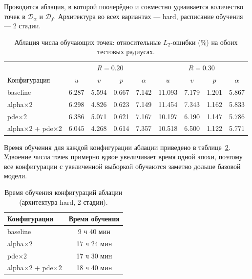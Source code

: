 \documentclass[12pt,a4paper]{article}
\begin{document}
Проводится аблация, в которой поочерёдно и совместно удваивается количество
точек в \(\mathcal{D}_\alpha\) и \(\mathcal{D}_f\). Архитектура во всех
вариантах --- hard, расписание обучения --- 2 стадии.

\begin{table}[H]
    \centering
    \begin{tabular}{l|cccc|cccc}
        \hline
        & \multicolumn{4}{c|}{\(R=0.20\)} & \multicolumn{4}{c}{\(R=0.30\)} \\
        Конфигурация & \(u\) & \(v\) & \(p\) & \(\alpha\) & \(u\) & \(v\) & \(p\) & \(\alpha\) \\
        \hline
        baseline                          & 6.287 & 5.594 & 0.667 & 7.142 & 11.093 & 7.179 & 1.201 & 5.867 \\
        alpha$\times$2                    & 6.298 & 4.826 & 0.623 & 7.149 & 11.454 & 7.343 & 1.162 & 5.833 \\
        pde$\times$2                      & 6.386 & 5.071 & 0.621 & 7.167 & 10.197 & 6.190 & 1.147 & 5.786 \\
        alpha$\times$2 + pde$\times$2     & 6.045 & 4.268 & 0.614 & 7.357 & 10.518 & 6.500 & 1.122 & 5.771 \\
        \hline
    \end{tabular}
    \caption{Аблация числа обучающих точек: относительные \(L_2\)-ошибки (\%) на обоих тестовых радиусах.}
    \label{tab:ablation}
\end{table}

Время обучения для каждой конфигурации аблации приведено в
таблице~\ref{tab:ablation_time}. Удвоение числа точек примерно вдвое увеличивает
время одной эпохи, поэтому все конфигурации с увеличенной выборкой обучаются
заметно дольше базовой модели.

\begin{table}[H]
    \centering
    \begin{tabular}{l|c}
        \hline
        Конфигурация & Время обучения \\
        \hline
        baseline              & 9 ч 40 мин \\
        alpha$\times$2        & 17 ч 24 мин \\
        pde$\times$2          & 17 ч 30 мин \\
        alpha$\times$2 + pde$\times$2 & 18 ч 40 мин \\
        \hline
    \end{tabular}
    \caption{Время обучения конфигураций аблации (архитектура hard, 2 стадии).}
    \label{tab:ablation_time}
\end{table}
\end{document}
